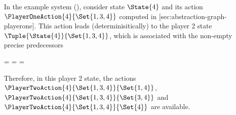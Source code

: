     In the example system (), consider state $\State{4}$ and its action $\PlayerOneAction{4}{\Set{1, 3, 4}}$ computed in [sec:abstraction-graph-playerone].
    This action leads (determinisitically) to the player 2 state $\Tuple{\State{4}}{\Set{1, 3, 4}}$, which is associated with the non-empty precise predecessors

    \startformula
        \startalign[n=2,align={left,left}]
            \NC {}
            \NC =  \EndComma
            \NR
            \NC {}
            \NC =  \EndAnd
            \NR
            \NC {}
            \NC =  \EndPeriod
            \NR
        \stopalign
    \stopformula

    Therefore, in this player 2 state, the actions $\PlayerTwoAction{4}{\Set{1, 3, 4}}{\Set{1, 4}}$, $\PlayerTwoAction{4}{\Set{1, 3, 4}}{\Set{3, 4}}$ and $\PlayerTwoAction{4}{\Set{1, 3, 4}}{\Set{4}}$ are available.

\stopsubsection


